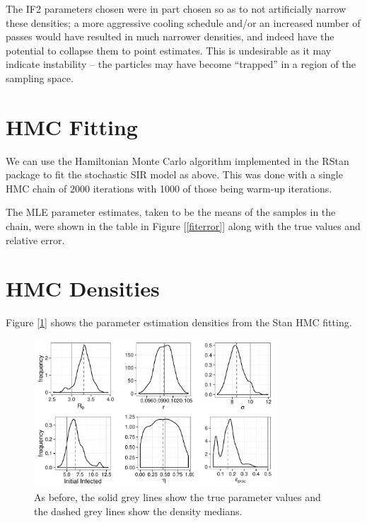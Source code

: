     The IF2 parameters chosen were in part chosen so as to not artificially narrow these densities; a more aggressive cooling schedule and/or an increased number of passes would have resulted in much narrower densities, and indeed have the potential to collapse them to point estimates. This is undesirable as it may indicate instability -- the particles may have become ``trapped'' in a region of the sampling space.


\section{HMC Fitting}

	We can use the Hamiltonian Monte Carlo algorithm implemented in the RStan package to fit the stochastic SIR model as above. This was done with a single HMC chain of 2000 iterations with 1000 of those being warm-up iterations.

	The MLE parameter estimates, taken to be the means of the samples in the chain, were shown in the table in Figure [\ref{fiterror}] along with the true values and relative error.


\section{HMC Densities}

	Figure [\ref{sc1hmckernels}] shows the parameter estimation densities from the Stan HMC fitting.

	\begin{figure}
        \centering
        \captionsetup{width=.8\linewidth}
        \includegraphics[width=0.8\textwidth]{./images/hmckernels.pdf}
        \caption{As before, the solid grey lines show the true parameter values and the dashed grey lines show the density medians. \label{sc1hmckernels}}
    \end{figure}

